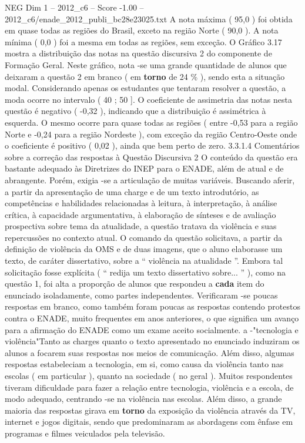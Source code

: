 \begin{textsample}{NEG Dim 1 – 2012\_c6 – Score -1.00 – 2012\_c6/enade\_2012\_publi\_bc28e23025.txt}
A nota máxima ( 95,0 ) foi obtida em quase todas as regiões do Brasil, exceto na região Norte ( 90,0 ).
A nota mínima ( 0,0 ) foi a mesma em todas as regiões, sem exceção.
O Gráfico 3.17 mostra a distribuição das notas na questão discursiva 2 do componente de Formação Geral.
Neste gráfico, nota -se uma grande quantidade de alunos que deixaram a questão 2 em branco ( em \textbf{torno} de 24 \% ), sendo esta a situação modal.
Considerando apenas os estudantes que tentaram resolver a questão, a moda ocorre no intervalo ( 40 ; 50 ].
O coeficiente de assimetria das notas nesta questão é negativo ( -0,32 ), indicando que a distribuição é assimétrica à esquerda.
O mesmo ocorre para quase todas as regiões ( entre -0,53 para a região Norte e -0,24 para a região Nordeste ), com exceção da região Centro-Oeste onde o coeficiente é positivo ( 0,02 ), ainda que bem perto de zero. 3.3.1.4 Comentários sobre a correção das respostas à Questão Discursiva 2 O conteúdo da questão era bastante adequado às Diretrizes do INEP para o ENADE, além de atual e de abrangente.
Porém, exigia -se a articulação de muitas variáveis.
Buscando aferir, a partir da apresentação de uma charge e de um texto introdutório, as competências e habilidades relacionadas à leitura, à interpretação, à análise crítica, à capacidade argumentativa, à elaboração de sínteses e de avaliação prospectiva sobre tema da atualidade, a questão tratava da violência e suas repercussões no contexto atual.
O comando da questão solicitava, a partir da definição de violência da OMS e de duas imagens, que o aluno elaborasse um texto, de caráter dissertativo, sobre a “ violência na atualidade ”.
Embora tal solicitação fosse explícita ( “ redija um texto dissertativo sobre... ” ), como na questão 1, foi alta a proporção de alunos que respondeu a \textbf{cada} item do enunciado isoladamente, como partes independentes.
Verificaram -se poucas respostas em branco, como também foram poucas as respostas contendo protestos contra o ENADE, muito frequentes em anos anteriores, o que significa um avanço para a afirmação do ENADE como um exame aceito socialmente. a -"tecnologia e violência"Tanto as charges quanto o texto apresentado no enunciado induziram os alunos a focarem suas respostas nos meios de comunicação.
Além disso, algumas respostas estabeleciam a tecnologia, em si, como causa da violência tanto nas escolas ( em particular ), quanto na sociedade ( no geral ).
Muitos respondentes tiveram dificuldade para fazer a relação entre tecnologia, violência e a escola, de modo adequado, centrando -se na violência nas escolas.
Além disso, a grande maioria das respostas girava em \textbf{torno} da exposição da violência através da TV, internet e jogos digitais, sendo que predominaram as abordagens com ênfase em programas e filmes veiculados pela televisão.

\end{textsample}
